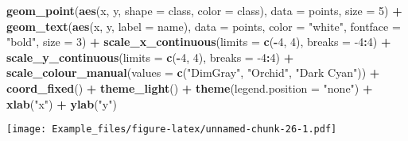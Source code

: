 \documentclass[]{article}
\newenvironment{Shaded}{\begin{snugshade}}{\end{snugshade}}
\newcommand{\DataTypeTok}[1]{\textcolor[rgb]{0.13,0.29,0.53}{#1}}
\newcommand{\DecValTok}[1]{\textcolor[rgb]{0.00,0.00,0.81}{#1}}
\newcommand{\KeywordTok}[1]{\textcolor[rgb]{0.13,0.29,0.53}{\textbf{#1}}}
\newcommand{\NormalTok}[1]{#1}
\newcommand{\OperatorTok}[1]{\textcolor[rgb]{0.81,0.36,0.00}{\textbf{#1}}}
\newcommand{\StringTok}[1]{\textcolor[rgb]{0.31,0.60,0.02}{#1}}
\begin{document}
\begin{Shaded}
\begin{Highlighting}[]
\StringTok{  }\KeywordTok{geom_point}\NormalTok{(}\KeywordTok{aes}\NormalTok{(x, y, }\DataTypeTok{shape =}\NormalTok{ class, }\DataTypeTok{color =}\NormalTok{ class), }\DataTypeTok{data =}\NormalTok{ points, }\DataTypeTok{size =} \DecValTok{5}\NormalTok{) }\OperatorTok{+}
\StringTok{  }\KeywordTok{geom_text}\NormalTok{(}\KeywordTok{aes}\NormalTok{(x, y, }\DataTypeTok{label =}\NormalTok{ name), }\DataTypeTok{data =}\NormalTok{ points, }\DataTypeTok{color =} \StringTok{"white"}\NormalTok{, }\DataTypeTok{fontface =} \StringTok{"bold"}\NormalTok{, }\DataTypeTok{size =} \DecValTok{3}\NormalTok{) }\OperatorTok{+}
\StringTok{  }
\StringTok{   }\KeywordTok{scale_x_continuous}\NormalTok{(}\DataTypeTok{limits =} \KeywordTok{c}\NormalTok{(}\OperatorTok{-}\DecValTok{4}\NormalTok{, }\DecValTok{4}\NormalTok{), }\DataTypeTok{breaks =} \DecValTok{-4}\OperatorTok{:}\DecValTok{4}\NormalTok{) }\OperatorTok{+}
\StringTok{  }\KeywordTok{scale_y_continuous}\NormalTok{(}\DataTypeTok{limits =} \KeywordTok{c}\NormalTok{(}\OperatorTok{-}\DecValTok{4}\NormalTok{, }\DecValTok{4}\NormalTok{), }\DataTypeTok{breaks =} \DecValTok{-4}\OperatorTok{:}\DecValTok{4}\NormalTok{) }\OperatorTok{+}
\StringTok{  }\KeywordTok{scale_colour_manual}\NormalTok{(}\DataTypeTok{values =} \KeywordTok{c}\NormalTok{(}\StringTok{"DimGray"}\NormalTok{, }\StringTok{"Orchid"}\NormalTok{, }\StringTok{"Dark Cyan"}\NormalTok{)) }\OperatorTok{+}
\StringTok{  }\KeywordTok{coord_fixed}\NormalTok{() }\OperatorTok{+}
\StringTok{  }
\StringTok{  }\KeywordTok{theme_light}\NormalTok{() }\OperatorTok{+}
\StringTok{  }\KeywordTok{theme}\NormalTok{(}\DataTypeTok{legend.position =} \StringTok{"none"}\NormalTok{) }\OperatorTok{+}
\StringTok{  }\KeywordTok{xlab}\NormalTok{(}\StringTok{"x"}\NormalTok{) }\OperatorTok{+}
\StringTok{  }\KeywordTok{ylab}\NormalTok{(}\StringTok{"y"}\NormalTok{)}
\end{Highlighting}
\end{Shaded}

\texttt{[image: Example\_files/figure-latex/unnamed-chunk-26-1.pdf]}
\end{document}
